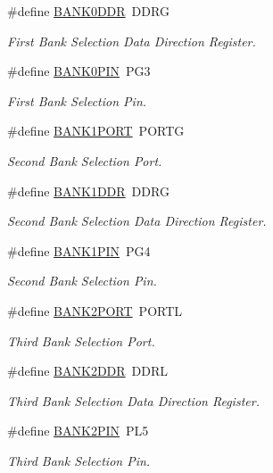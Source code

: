 \begin{DoxyCompactItemize}
\#define \hyperlink{group__xmem_gafba0bbf9336cfc754622a5e9b3d12d80}{B\-A\-N\-K0\-D\-D\-R}~D\-D\-R\-G
\begin{DoxyCompactList}\small\item\em First Bank Selection Data Direction Register. \end{DoxyCompactList}\item 
\#define \hyperlink{group__xmem_gaa176e9b2752f764cd7e7d9fd49d46af8}{B\-A\-N\-K0\-P\-I\-N}~P\-G3
\begin{DoxyCompactList}\small\item\em First Bank Selection Pin. \end{DoxyCompactList}\item 
\#define \hyperlink{group__xmem_ga8b3ee7126196f6e939989eae097c3ac4}{B\-A\-N\-K1\-P\-O\-R\-T}~P\-O\-R\-T\-G
\begin{DoxyCompactList}\small\item\em Second Bank Selection Port. \end{DoxyCompactList}\item 
\#define \hyperlink{group__xmem_gada13cb9312072b48628763a6e1fd50d3}{B\-A\-N\-K1\-D\-D\-R}~D\-D\-R\-G
\begin{DoxyCompactList}\small\item\em Second Bank Selection Data Direction Register. \end{DoxyCompactList}\item 
\#define \hyperlink{group__xmem_gacfebedc2067e3c52e6ae1f627afcc1e1}{B\-A\-N\-K1\-P\-I\-N}~P\-G4
\begin{DoxyCompactList}\small\item\em Second Bank Selection Pin. \end{DoxyCompactList}\item 
\#define \hyperlink{group__xmem_gad35afb0251524c201c2d60f3d035af32}{B\-A\-N\-K2\-P\-O\-R\-T}~P\-O\-R\-T\-L
\begin{DoxyCompactList}\small\item\em Third Bank Selection Port. \end{DoxyCompactList}\item 
\#define \hyperlink{group__xmem_ga62f56230c5f5f7220c44ab1c93d677ab}{B\-A\-N\-K2\-D\-D\-R}~D\-D\-R\-L
\begin{DoxyCompactList}\small\item\em Third Bank Selection Data Direction Register. \end{DoxyCompactList}\item 
\#define \hyperlink{group__xmem_ga74c95f6ccdb5e482e97a5af53ed74229}{B\-A\-N\-K2\-P\-I\-N}~P\-L5
\begin{DoxyCompactList}\small\item\em Third Bank Selection Pin. \end{DoxyCompactList}\end{DoxyCompactItemize}
